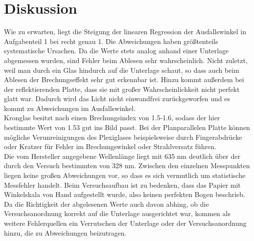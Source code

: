 \section{Diskussion}
\label{sec:Diskussion}

Wie zu erwarten, liegt die Steigung der linearen Regression der Ausfallswinkel in Aufgabenteil 1 bei 
recht genau 1. Die Abweichungen haben größtenteils systematische Ursachen. Da die Werte stets analog 
anhand einer Unterlage abgemessen wurden, sind Fehler beim Ablesen sehr wahrscheinlich.
Nicht zuletzt, weil man durch ein Glas hindurch auf die Unterlage schaut, so dass auch beim Ablesen
der Brechungseffekt sehr gut erkennbar ist. Hinzu kommt außerdem bei der reflektierenden 
Platte, dass sie mit großer Wahrscheinlichkeit nicht perfekt glatt war. Dadurch wird das 
Licht nicht einwandfrei zurückgeworfen und es kommt zu Abweichungen im Ausfallswinkel. \\
 
Kronglas besitzt nach \cite{brechind} einen Brechungsindex von 1.5-1.6, sodass der hier bestimmte Wert von 
1.53 gut ins Bild passt. Bei der Planparallelen Platte können mögliche Verunreinigungen des 
Plexiglases beispielsweise durch Fingerabdrücke oder Kratzer für Fehler im Brechungswinkel oder 
Strahlversatz führen. \\

Die vom Hersteller angegebene Wellenlänge liegt mit 635 nm deutlich über der durch den Versuch 
bestimmten von 328 nm. Zwischen den einzelnen Messpunkten liegen keine großen Abweichungen 
vor, so dass es sich vermutlich um statistische Messfehler handelt. Beim Versuchsaufbau ist 
zu bedenken, dass das Papier mit Winkelskala von Hand aufgestellt wurde, also keinen perfekten 
Bogen beschrieb. Da die Richtigkeit der abgelesenen Werte auch davon abhing, ob die Versuchsanordnung
korrekt auf die Unterlage ausgerichtet war, kommen als weitere Fehlerquellen ein Verrutschen
der Unterlage oder der Versuchsanordnung hinzu, die zu Abweichungen beizutragen.\\

